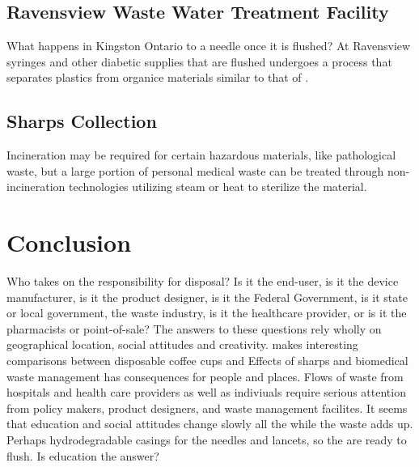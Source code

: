 \documentclass[12pt]{article}
\begin{document}
\subsection{Ravensview Waste Water Treatment Facility}
What happens in Kingston Ontario to a needle once it is flushed?
At Ravensview syringes and other diabetic supplies that are flushed undergoes a process that separates plastics from organice materials similar to that of \citet{anthony_method_1994}. 


% 
% 

\subsection{Sharps Collection} 
Incineration may be required for certain hazardous materials, like pathological waste, but a large portion of personal medical waste can be treated through non-incineration technologies utilizing steam or heat to sterilize the material. 


\section{Conclusion}
Who takes on the responsibility for disposal?  Is it the end-user, is it the device manufacturer, is it the product designer, is it the Federal Government, is it state or local government, the waste industry, is it the healthcare provider, or is it the pharmacists or point-of-sale? The answers to these questions rely wholly on geographical location, social attitudes and creativity. \citet{krisiunas_waste_2011} makes interesting comparisons between disposable coffee cups and 
Effects of sharps and biomedical waste management has consequences for people and places. Flows of waste from hospitals and health care providers as well as indiviuals require serious attention from policy makers, product designers, and waste management facilites. 
It seems that education and social attitudes change slowly all the while the waste adds up. Perhaps hydrodegradable casings for the needles and lancets, so the are ready to flush. Is education the answer?
\end{document}

